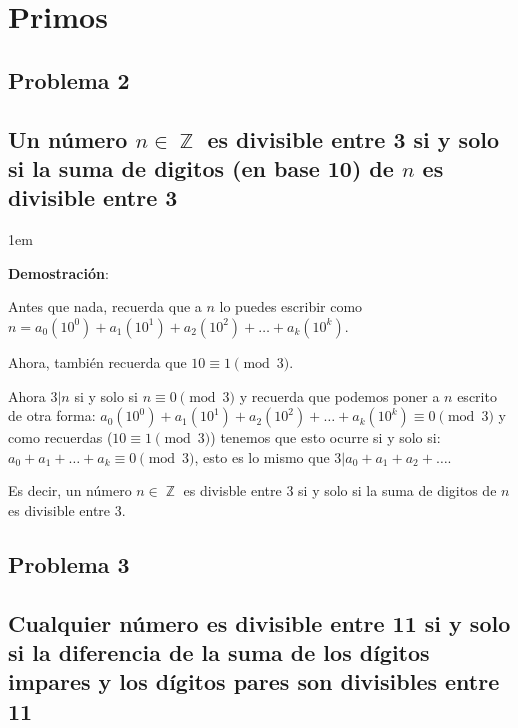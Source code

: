 \documentclass[12pt, fleqn]{article}                             %
\newenvironment{SmallIndentation}[1][0.75em]                    %
    {\begin{adjustwidth}{#1}{}\begin{footnotesize}}                 %
    {\end{footnotesize}\end{adjustwidth}}                           %
\DeclareMathOperator \Integers  {\mathbb{Z}}                     %
\begin{document}
\section{Primos}

    \subsection{Problema 2}
    \subsection*{Un número $n \in \Integers$ es divisible entre 3 si y solo si
        la suma de digitos (en base 10) de $n$ es divisible entre 3}

        \begin{SmallIndentation}[1em]
            \textbf{Demostración}:

            Antes que nada, recuerda que a $n$ lo puedes escribir como
            $n = a_0(10^0) + a_1(10^1) + a_2(10^2) + \dots + a_k(10^k)$.

            Ahora, también recuerda que $10 \equiv 1 \pmod{3}$.

            Ahora $3|n$ si y solo si $n \equiv 0 \pmod{3}$ y recuerda
            que podemos poner a $n$ escrito de otra forma:
            $a_0(10^0) + a_1(10^1) + a_2(10^2) + \dots + a_k(10^k) \equiv 0 \pmod{3}$
            y como recuerdas ($10 \equiv 1 \pmod{3}$) tenemos que esto ocurre
            si y solo si:  $a_0 + a_1 +\dots +a_k \equiv 0 \pmod{3}$, esto es lo mismo que
            $3|a_0+a_1+a_2+\dots$.

            Es decir, un número $n \in \Integers$ es divisble entre 3 si y solo si
            la suma de digitos de $n$ es divisible entre 3.

        \end{SmallIndentation}



    \subsection{Problema 3}
    \subsection*{Cualquier número es divisible entre 11 si y solo si la diferencia de la suma
        de los dígitos impares y los dígitos pares son divisibles entre 11}
\end{document}

